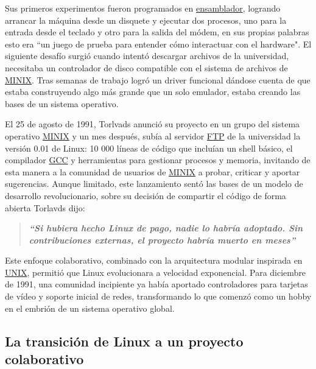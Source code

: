 \documentclass[a4paper,12pt]{article}
\begin{document}
Sus primeros experimentos fueron programados en \hyperref[assembler]{ensamblador}, logrando arrancar
la máquina desde un disquete y ejecutar dos procesos, uno para la entrada desde
el teclado y otro para la salida del módem, en sus propias palabras esto era ``un
juego de prueba para entender cómo interactuar con el hardware". El siguiente
desafío surgió cuando intentó descargar archivos de la universidad, necesitaba
un controlador de disco compatible con el sistema de archivos de \hyperref[minix]{MINIX}. Tras
semanas de trabajo logró un driver funcional dándose cuenta de que estaba 
construyendo algo más grande que un solo emulador, estaba creando las bases de
un sistema operativo.

El 25 de agosto de 1991, Torlvads anunció su proyecto en un grupo del sistema
operativo \hyperref[minix]{MINIX} y un mes después, subía al servidor \hyperref[ftp]{FTP} de la universidad la
versión 0.01 de Linux: 10 000 líneas de código que incluían un shell básico, el
compilador \hyperref[gcc]{GCC} y herramientas para gestionar procesos y memoria, invitando de
esta manera a la comunidad de usuarios de \hyperref[minix]{MINIX} a probar, criticar y aportar
sugerencias. Aunque limitado, este lanzamiento sentó las bases de un modelo de
desarrollo revolucionario, sobre su decisión de compartir el código de forma
abierta Torlavds dijo:
\begin{quote}
    \textbf{\textit{“Si hubiera hecho Linux de pago, nadie lo habría
    adoptado. Sin contribuciones externas, el proyecto habría muerto en meses”}} 
\end{quote}

Este enfoque colaborativo, combinado con la arquitectura modular inspirada en
\hyperref[unix]{UNIX}, permitió que Linux evolucionara a velocidad exponencial. Para diciembre de
1991, una comunidad incipiente ya había aportado controladores para tarjetas de
vídeo y soporte inicial de redes, transformando lo que comenzó como un hobby en
el embrión de un sistema operativo global.

\subsection{La transición de Linux a un proyecto colaborativo}
\end{document}
